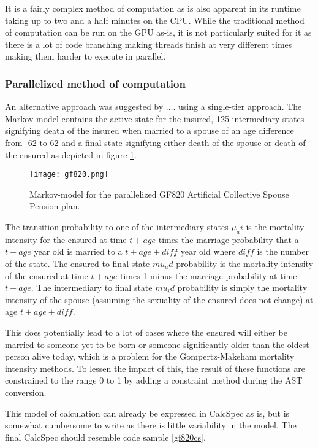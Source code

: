 It is a fairly complex method of computation as is also apparent in its runtime taking up to two and a half minutes on the CPU.
While the traditional method of computation can be run on the GPU as-is, it is not particularly suited for it as there is a lot of code branching making threads finish at very different times making them harder to execute in parallel.

\subsubsection{Parallelized method of computation}
An alternative approach was suggested by .... using a single-tier approach.
The Markov-model contains the active state for the insured, 125 intermediary states signifying death of the insured when married to a spouse of an age difference from -62 to 62 and a final state signifying either death of the spouse or death of the ensured as depicted in figure \ref{fig:gf820}.

\begin{figure}[h!]\centering
\texttt{[image: gf820.png]}
\caption{Markov-model for the parallelized GF820 Artificial Collective Spouse Pension plan.\label{fig:gf820}}
\end{figure}

The transition probability to one of the intermediary states $\mu_ai$ is the mortality intensity for the ensured at time $t + age$ times the marriage probability that a $t + age$ year old is married to a $t + age + diff$ year old where $diff$ is the number of the state.
The ensured to final state $mu_ad$ probability is the mortality intensity of the ensured at time $t + age$ times 1 minus the marriage probability at time $t + age$.
The intermediary to final state $mu_id$ probability is simply the mortality intensity of the spouse (assuming the sexuality of the ensured does not change) at age $t + age + diff$.

This does potentially lead to a lot of cases where the ensured will either be married to someone yet to be born or someone significantly older than the oldest person alive today, which is a problem for the Gompertz-Makeham mortality intensity methods.
To lessen the impact of this, the result of these functions are constrained to the range 0 to 1 by adding a constraint method during the AST conversion.

This model of calculation can already be expressed in CalcSpec as is, but is somewhat cumbersome to write as there is little variability in the model.
The final CalcSpec should resemble code sample \ref{gf820cs}.

